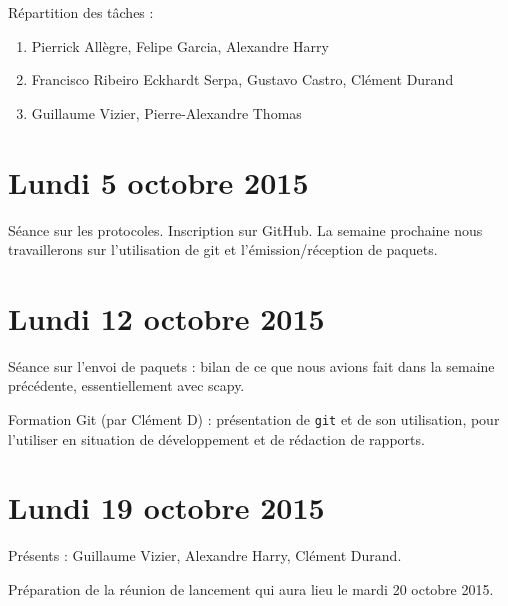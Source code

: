 \documentclass[a4paper, 11pt]{article}
\begin{document}
Répartition des tâches :
\begin{enumerate}
	\item Pierrick Allègre, Felipe Garcia, Alexandre Harry
	\item Francisco Ribeiro Eckhardt Serpa, Gustavo Castro, Clément Durand
	\item Guillaume Vizier, Pierre-Alexandre Thomas
\end{enumerate}

\section{Lundi 5 octobre 2015}

Séance sur les protocoles. Inscription sur GitHub. La semaine prochaine nous travaillerons sur l'utilisation de git et l'émission/réception de paquets.

\section{Lundi 12 octobre 2015}

Séance sur l'envoi de paquets : bilan de ce que nous avions fait dans la semaine précédente, essentiellement avec scapy.

Formation Git (par Clément D) : présentation de \verb!git! et de son utilisation, pour l'utiliser en situation de développement et de rédaction de rapports.

\clearpage
\section{Lundi 19 octobre 2015}

Présents : Guillaume Vizier, Alexandre Harry, Clément Durand.

Préparation de la réunion de lancement qui aura lieu le mardi 20 octobre 2015.
\end{document}
